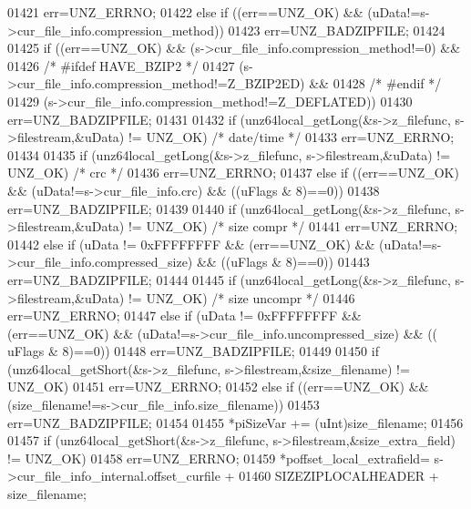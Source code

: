 \begin{DoxyCode}
01421         err=UNZ\_ERRNO;
01422     \textcolor{keywordflow}{else} \textcolor{keywordflow}{if} ((err==UNZ\_OK) && (uData!=s->cur\_file\_info.compression\_method))
01423         err=UNZ\_BADZIPFILE;
01424 
01425     \textcolor{keywordflow}{if} ((err==UNZ\_OK) && (s->cur\_file\_info.compression\_method!=0) &&
01426 \textcolor{comment}{/* #ifdef HAVE\_BZIP2 */}
01427                          (s->cur\_file\_info.compression\_method!=Z\_BZIP2ED) &&
01428 \textcolor{comment}{/* #endif */}
01429                          (s->cur\_file\_info.compression\_method!=Z\_DEFLATED))
01430         err=UNZ\_BADZIPFILE;
01431 
01432     \textcolor{keywordflow}{if} (unz64local\_getLong(&s->z\_filefunc, s->filestream,&uData) != UNZ\_OK) \textcolor{comment}{/* date/time */}
01433         err=UNZ\_ERRNO;
01434 
01435     \textcolor{keywordflow}{if} (unz64local\_getLong(&s->z\_filefunc, s->filestream,&uData) != UNZ\_OK) \textcolor{comment}{/* crc */}
01436         err=UNZ\_ERRNO;
01437     \textcolor{keywordflow}{else} \textcolor{keywordflow}{if} ((err==UNZ\_OK) && (uData!=s->cur\_file\_info.crc) && ((uFlags & 8)==0))
01438         err=UNZ\_BADZIPFILE;
01439 
01440     \textcolor{keywordflow}{if} (unz64local\_getLong(&s->z\_filefunc, s->filestream,&uData) != UNZ\_OK) \textcolor{comment}{/* size compr */}
01441         err=UNZ\_ERRNO;
01442     \textcolor{keywordflow}{else} \textcolor{keywordflow}{if} (uData != 0xFFFFFFFF && (err==UNZ\_OK) && (uData!=s->cur\_file\_info.compressed\_size) && ((uFlags 
      & 8)==0))
01443         err=UNZ\_BADZIPFILE;
01444 
01445     \textcolor{keywordflow}{if} (unz64local\_getLong(&s->z\_filefunc, s->filestream,&uData) != UNZ\_OK) \textcolor{comment}{/* size uncompr */}
01446         err=UNZ\_ERRNO;
01447     \textcolor{keywordflow}{else} \textcolor{keywordflow}{if} (uData != 0xFFFFFFFF && (err==UNZ\_OK) && (uData!=s->cur\_file\_info.uncompressed\_size) && ((
      uFlags & 8)==0))
01448         err=UNZ\_BADZIPFILE;
01449 
01450     \textcolor{keywordflow}{if} (unz64local\_getShort(&s->z\_filefunc, s->filestream,&size\_filename) != UNZ\_OK)
01451         err=UNZ\_ERRNO;
01452     \textcolor{keywordflow}{else} \textcolor{keywordflow}{if} ((err==UNZ\_OK) && (size\_filename!=s->cur\_file\_info.size\_filename))
01453         err=UNZ\_BADZIPFILE;
01454 
01455     *piSizeVar += (uInt)size\_filename;
01456 
01457     \textcolor{keywordflow}{if} (unz64local\_getShort(&s->z\_filefunc, s->filestream,&size\_extra\_field) != UNZ\_OK)
01458         err=UNZ\_ERRNO;
01459     *poffset\_local\_extrafield= s->cur\_file\_info\_internal.offset\_curfile +
01460                                     SIZEZIPLOCALHEADER + size\_filename;

\end{DoxyCode}
